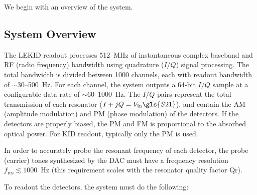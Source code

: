 We begin with an overview of the system.

\subsection{System Overview}\label{sys overview}

The LEKID readout processes 512~MHz of instantaneous complex baseband and RF (radio frequency) bandwidth using quadrature ($I/Q$) signal processing. The total bandwidth is divided between 1000 channels, each with readout bandwidth of $\sim$30--500~Hz. For each channel, the system outputs a 64-bit $I/Q$ sample at a configurable data rate of $\sim$60--1000~Hz. The $I/Q$ pairs represent the total transmission of each resonator ($I + jQ = V_{\mathrm{in}}\gls{S21}$), and contain the AM (amplitude modulation) and PM (phase modulation) of the detectors. If the detectors are properly biased, the PM and FM is proportional to the absorbed optical power. For KID readout, typically only the PM is used.

In order to accurately probe the resonant frequency of each detector, the probe (carrier) tones synthesized by the DAC must have a frequency resolution $f_{\mathrm{res}} \lesssim 1000$~Hz (this requirement scales with the resonator quality factor \gls{Qr}).


To readout the detectors, the system must do the following:

